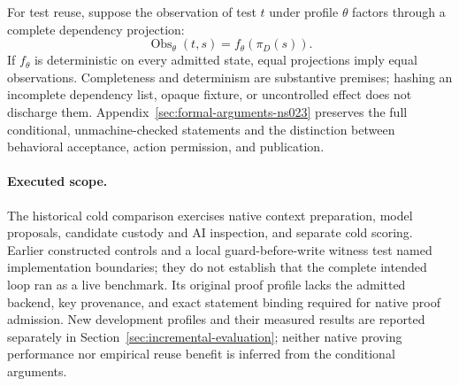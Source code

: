 For test reuse, suppose the observation of test $t$ under profile $\theta$
factors through a complete dependency projection:
\[
  \operatorname{Obs}_{\theta}(t,s)=f_{\theta}(\pi_D(s)).
\]
If $f_\theta$ is deterministic on every admitted state, equal projections imply
equal observations. Completeness and determinism are substantive premises;
hashing an incomplete dependency list, opaque fixture, or uncontrolled effect
does not discharge them. Appendix~\ref{sec:formal-arguments-ns023} preserves
the full conditional, unmachine-checked statements and the distinction between
behavioral acceptance, action permission, and publication.

\paragraph{Executed scope.}
The historical cold comparison exercises native context preparation, model proposals,
candidate custody and AI inspection, and separate cold scoring. Earlier
constructed controls and a local guard-before-write witness test named
implementation boundaries; they do not establish that the complete intended
loop ran as a live benchmark. Its original proof profile lacks the admitted
backend, key provenance, and exact statement binding required for native proof
admission. New development profiles and their measured results are reported
separately in Section~\ref{sec:incremental-evaluation}; neither native proving
performance nor empirical reuse benefit is inferred from the conditional arguments.
